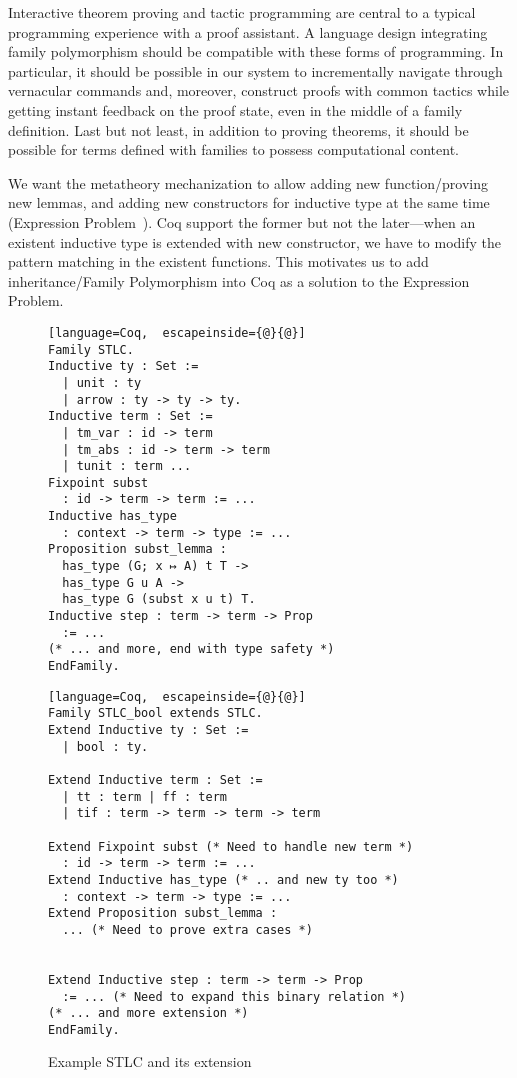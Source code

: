 Interactive theorem proving and tactic programming are central to
a typical programming experience with a proof assistant.
A language design integrating family polymorphism should be compatible
with these forms of programming.
In particular, it should be possible in our system to
incrementally navigate through vernacular commands and, moreover, construct proofs
with common tactics while getting instant feedback on the proof state,
even in the middle of a family definition.
Last but not least, in addition to proving theorems,
it should be possible for terms defined with families to possess computational content.

\ifShowOldWriting

\newpage

We want the metatheory mechanization to allow adding new
function/proving new lemmas, and adding new constructors for inductive
type at the same time  (Expression Problem~\cite{wadler-ep}). Coq
support the former but not the later---when an existent inductive type
is extended with new constructor, we have to modify the pattern matching
in the existent functions. This motivates us to add inheritance/Family
Polymorphism into Coq as a solution to the Expression Problem. 

\begin{figure}[!htb]
  \begin{minipage}[t]{0.47\linewidth}
\begin{lstlisting}[language=Coq,  escapeinside={@}{@}]
Family STLC.
Inductive ty : Set :=
  | unit : ty
  | arrow : ty -> ty -> ty.
Inductive term : Set := 
  | tm_var : id -> term 
  | tm_abs : id -> term -> term 
  | tunit : term ...
Fixpoint subst 
  : id -> term -> term := ...
Inductive has_type 
  : context -> term -> type := ...
Proposition subst_lemma :
  has_type (G; x ↦ A) t T ->
  has_type G u A ->
  has_type G (subst x u t) T.
Inductive step : term -> term -> Prop 
  := ...
(* ... and more, end with type safety *)
EndFamily.
\end{lstlisting}
  \end{minipage}
  \begin{minipage}[t]{0.47\linewidth}
\begin{lstlisting}[language=Coq,  escapeinside={@}{@}]
Family STLC_bool extends STLC.
Extend Inductive ty : Set :=
  | bool : ty.

Extend Inductive term : Set := 
  | tt : term | ff : term 
  | tif : term -> term -> term -> term

Extend Fixpoint subst (* Need to handle new term *)
  : id -> term -> term := ...
Extend Inductive has_type (* .. and new ty too *)
  : context -> term -> type := ...
Extend Proposition subst_lemma :
  ... (* Need to prove extra cases *)


Extend Inductive step : term -> term -> Prop 
  := ... (* Need to expand this binary relation *)
(* ... and more extension *)
EndFamily.
\end{lstlisting}
  \end{minipage}
  \caption{Example STLC and its extension}\label{fig:STLC-example}
\end{figure}

